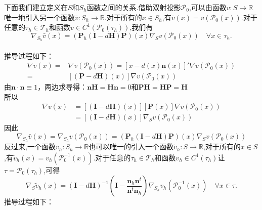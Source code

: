 \documentclass{article}
\begin{document}
下面我们建立定义在$S$和$S_h$函数之间的关系.借助双射投影$\mathcal{P}_0$,可以由函数$v:S\rightarrow\mathbb{R}$唯一地引入另一个函数$\bar{v}:S_h\rightarrow\mathbb{R}$.对于所有的$x\in S_h$,有$\bar{v}(x)=v(\mathcal{P}_0(x))$.对于任意的$\tau_h\in\mathcal{T}_h$和函数$v\in C^1(\mathcal{P}_0(\tau_h))$,我们有
\begin{equation*}
\nabla_{S_h}\bar{v}(x)=(\boldsymbol{P}_h(\boldsymbol{I}-d\boldsymbol{H})\boldsymbol{P})(x)\nabla_{S}v(\mathcal{P}_0(x))\quad\forall x\in \tau_h.
\end{equation*}\\
推导过程如下：
\begin{equation*}
\begin{aligned}
\nabla v(x)= &\nabla v(\mathcal{P}_0(x))=[x-d(x)\boldsymbol{n}(x)]'\nabla v(\mathcal{P}_0(x))\\
=&[(\boldsymbol{P}-d\boldsymbol{H})(x)]\nabla v(\mathcal{P}_0(x))
\end{aligned}
\end{equation*}
由$\boldsymbol{n}\cdot\boldsymbol{n}\equiv 1$，两边求导得：$\boldsymbol{n}\boldsymbol{H}=\boldsymbol{H}\boldsymbol{n}=0$和$\boldsymbol{P}\boldsymbol{H}=\boldsymbol{H}\boldsymbol{P}=\boldsymbol{H}$\\
所以
\begin{equation*}
\begin{aligned}
\nabla v(x)&=[(\boldsymbol{I}-d\boldsymbol{H})(x)][\boldsymbol{P}(x)]\nabla v(\mathcal{P}_0(x))\\
&=[(\boldsymbol{I}-d\boldsymbol{H})(x)]\nabla_S v(\mathcal{P}_0(x))
\end{aligned}
\end{equation*}
因此
\begin{equation*}
\nabla_{S_h}\bar{v}(x)=\nabla_{S_h}v(\mathcal{P}_0(x))=(\boldsymbol{P}_h(\boldsymbol{I}-d\boldsymbol{H})\boldsymbol{P})(x)\nabla_{S}v(\mathcal{P}_0(x))
\end{equation*}
反过来,一个函数$v_h:S_h\rightarrow\mathbb{R}$也可以唯一的引入一个函数$\tilde{v}_h:S\rightarrow\mathbb{R}$,对于所有的$x\in S$,有$\tilde{v}_h(x)=v_h(\mathcal{P}^{-1}_0(x))$.对于任意的$\tau_h\in\mathcal{T}_h$和函数$v_h\in C^1(\tau_h)$让$\tau=\mathcal{P}_0(\tau_h)$,可得
\begin{equation*}
\nabla_{S}\tilde{v}_h(x)=(\boldsymbol{I}-d\boldsymbol{H})^{-1}\left(\boldsymbol{I}-\frac{\boldsymbol{n}_h\boldsymbol{n}^t}{\boldsymbol{n}^t\boldsymbol{n}_h}\right)\nabla_{S_h}v_h(\mathcal{P}^{-1}_0(x))\quad\forall x\in\tau.
\end{equation*}
推导过程如下：\\
\end{document}
